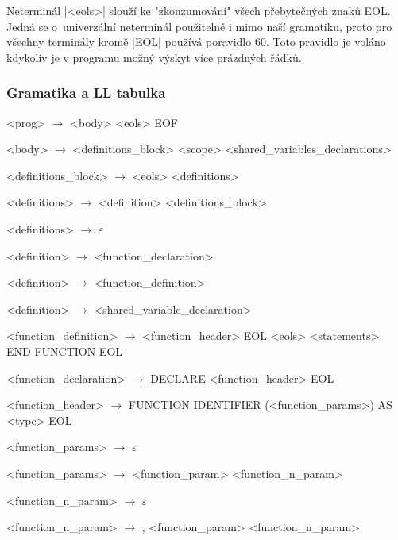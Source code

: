 Neterminál \ic|<eols>| slouží ke "zkonzumování" všech přebytečných znaků EOL. Jedná se o~univerzální neterminál použitelné
i mimo naší gramatiku, proto pro všechny terminály kromě \ic|EOL| používá poravidlo 60. Toto pravidlo je voláno kdykoliv
je v programu možný výskyt více prázdných řádků.

\subsubsection{Gramatika a LL tabulka}
\begin{normalsize}
    \begin{enumerate}
        {\small
        \item <prog> $\rightarrow$ <body> <eols> EOF
        \item <body> $\rightarrow$ <definitions\_block> <scope> <shared\_variables\_declarations>

        \item <definitions\_block> $\rightarrow$ <eols> <definitions>

        \item <definitions> $\rightarrow$ <definition> <definitions\_block>
        \item <definitions> $\rightarrow$ $\varepsilon$

        \item <definition> $\rightarrow$ <function\_declaration>
        \item <definition> $\rightarrow$ <function\_definition>
        \item <definition> $\rightarrow$ <shared\_variable\_declaration>

        \item <function\_definition> $\rightarrow$ <function\_header> EOL <eols> <statements> END FUNCTION EOL
        \item <function\_declaration> $\rightarrow$ DECLARE <function\_header> EOL

        \item <function\_header> $\rightarrow$ FUNCTION IDENTIFIER (<function\_params>) AS <type> EOL

        \item <function\_params> $\rightarrow$ $\varepsilon$
        \item <function\_params> $\rightarrow$ <function\_param> <function\_n\_param>

        \item <function\_n\_param> $\rightarrow$ $\varepsilon$
        \item <function\_n\_param> $\rightarrow$ , <function\_param> <function\_n\_param>

}
\end{enumerate}
\end{normalsize}
